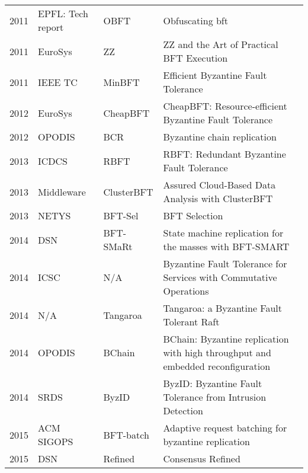 \documentclass{article}
\begin{document}
\begin{landscape}
\begin{table}[]
{\begin{tabular}{llll}
2011 & EPFL: Tech report & OBFT           & Obfuscating bft                                                                           \\
2011 & EuroSys           & ZZ             & ZZ and the Art of Practical BFT Execution                                                 \\
2011 & IEEE TC           & MinBFT         & Efficient Byzantine Fault Tolerance                                                       \\
2012 & EuroSys           & CheapBFT       & CheapBFT: Resource-efficient Byzantine Fault Tolerance                                    \\
2012 & OPODIS            & BCR            & Byzantine chain replication                                                               \\
2013 & ICDCS             & RBFT           & RBFT: Redundant Byzantine Fault Tolerance                                                 \\
2013 & Middleware        & ClusterBFT     & Assured Cloud-Based Data Analysis with ClusterBFT                                         \\
2013 & NETYS             & BFT-Sel        & BFT Selection                                                                             \\
2014 & DSN               & BFT-SMaRt      & State machine replication for the masses with BFT-SMART                                   \\
2014 & ICSC              & N/A            & Byzantine Fault Tolerance for Services with Commutative Operations                        \\
2014 & N/A               & Tangaroa       & Tangaroa: a Byzantine Fault Tolerant Raft                                                 \\
2014 & OPODIS            & BChain         & BChain: Byzantine replication with high throughput and embedded reconfiguration           \\
2014 & SRDS              & ByzID          & ByzID: Byzantine Fault Tolerance from Intrusion Detection                                 \\
2015 & ACM SIGOPS        & BFT-batch      & Adaptive request batching for byzantine replication                                       \\
2015 & DSN               & Refined        & Consensus Refined                                                                         \\

\end{tabular}}
\end{table}
\end{landscape}
\end{document}
